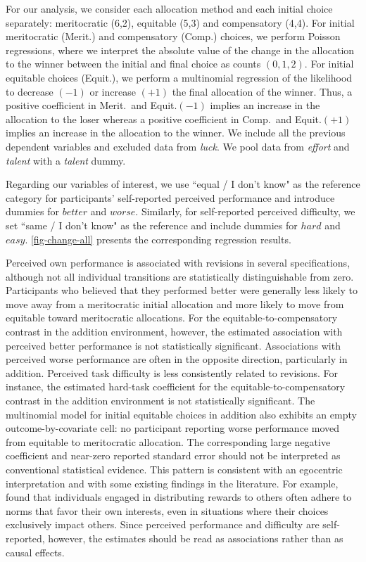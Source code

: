 \documentclass[11pt]{article}
\begin{document}
For our analysis, we consider each allocation method and each initial choice separately: meritocratic (6,2), equitable (5,3) and compensatory (4,4). For initial meritocratic (Merit.) and compensatory (Comp.) choices, we perform Poisson regressions, where we interpret the absolute value of the change in the allocation to the winner between the initial and final choice as counts $(0,1,2)$.
For initial equitable choices (Equit.), we perform a multinomial regression of the likelihood to decrease $(-1)$ or increase $(+1)$ the final allocation of the winner. Thus, a positive coefficient in Merit.\ and Equit.$(-1)$ implies an increase in the allocation to the loser whereas a positive coefficient in Comp.\ and Equit.$(+1)$ implies an increase in the allocation to the winner. We include all the previous  dependent variables 
and excluded data from \emph{luck}. 
We pool data from \emph{effort} and \emph{talent} with a \emph{talent} dummy. 

Regarding our variables of interest, we use ``equal / I don't know" as the reference category for participants’ self-reported perceived performance and introduce dummies for $better$ and $worse$. Similarly, for self-reported perceived difficulty, we set ``same / I don't know" as the reference and include dummies for $hard$ and $easy$. \autoref{fig-change-all} presents the corresponding regression results.



Perceived own performance is associated with revisions in several specifications, although not all individual transitions are statistically distinguishable from zero. Participants who believed that they performed better were generally less likely to move away from a meritocratic initial allocation and more likely to move from equitable toward meritocratic allocations. For the equitable-to-compensatory contrast in the addition environment, however, the estimated association with perceived better performance is not statistically significant. Associations with perceived worse performance are often in the opposite direction, particularly in addition. Perceived task difficulty is less consistently related to revisions. 
For instance, the estimated hard-task coefficient for the equitable-to-compensatory contrast in the addition environment is not statistically significant. The multinomial model for initial equitable choices in addition also exhibits an empty outcome-by-covariate cell: no participant reporting worse performance moved from equitable to meritocratic allocation. The corresponding large negative coefficient and near-zero reported standard error should not be interpreted as conventional statistical evidence. 
This pattern is consistent with an egocentric interpretation and with some existing findings in the literature. For example, \citet{neuber2021egocentric} found that individuals engaged in distributing rewards to others often adhere to norms that favor their own interests, even in situations where their choices exclusively impact others. Since perceived performance and difficulty are self-reported, however, the estimates should be read as associations rather than as causal effects.
\end{document}
